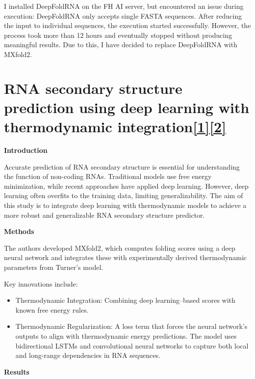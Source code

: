 \documentclass{article}
\begin{document}
\begin{large}
\begin{large}
\begin{large}
I installed DeepFoldRNA on the FH AI server, but encountered an issue during execution: DeepFoldRNA only accepts single FASTA sequences. After reducing the input to individual sequences, the execution started successfully. However, the process took more than 12 hours and eventually stopped without producing meaningful results. Due to this, I have decided to replace DeepFoldRNA with MXfold2.


\section{RNA secondary structure prediction using deep learning with thermodynamic integration\href{https://doi.org/10.1038/s41467-021-21194-4}{\textbf{[1]}}\href{https://github.com/mxfold/mxfold2?tab=readme-ov-file}{\textbf{[2]}}}

\textbf{Introduction}\par
Accurate prediction of RNA secondary structure is essential for understanding the function of non-coding RNAs. Traditional models use free energy minimization, while recent approaches have applied deep learning. However, deep learning often overfits to the training data, limiting generalizability. The aim of this study is to integrate deep learning with thermodynamic models to achieve a more robust and generalizable RNA secondary structure predictor.\vspace{1em}

\textbf{Methods}\par
The authors developed MXfold2, which computes folding scores using a deep neural network and integrates these with experimentally derived thermodynamic parameters from Turner's model.
\vspace{1em}

Key innovations include:
\begin{itemize}
        \item Thermodynamic Integration: Combining deep learning–based scores with known free energy rules.
        \item Thermodynamic Regularization: A loss term that forces the neural network’s outputs to align with thermodynamic energy predictions. The model uses bidirectional LSTMs and convolutional neural networks to capture both local and long-range dependencies in RNA sequences.\\[0.5em]
\end{itemize} 

\textbf{Results}\par


\end{large}
\end{large}
\end{large}
\end{document}
